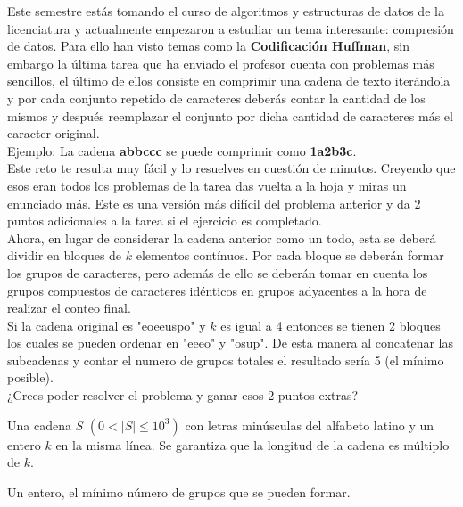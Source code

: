 
Este semestre estás tomando el curso de algoritmos y estructuras de datos de la licenciatura y actualmente empezaron a estudiar un tema interesante: compresión de datos. Para ello han visto temas como la \textbf{Codificación Huffman}, sin embargo la última tarea que ha enviado el profesor cuenta con problemas más sencillos, el último de ellos consiste en comprimir una cadena de texto iterándola y por cada conjunto repetido de caracteres deberás contar la cantidad de los mismos y después reemplazar el conjunto por dicha cantidad de caracteres más el caracter original.
\\

Ejemplo: La cadena  \textbf{abbccc} se puede comprimir como \textbf{1a2b3c}.\\

Este reto te resulta muy fácil y lo resuelves en cuestión de minutos. Creyendo que esos eran todos los problemas de la tarea das vuelta a la hoja y miras un enunciado más. Este es una versión más difícil del problema anterior y da 2 puntos adicionales a la tarea si el ejercicio es completado.\\

Ahora, en lugar de considerar la cadena anterior como un todo, esta se deberá dividir en bloques de $k$ elementos contínuos. Por cada bloque se deberán formar los grupos de caracteres, pero además de ello se deberán tomar en cuenta los grupos compuestos de caracteres idénticos en grupos adyacentes a la hora de realizar el conteo final.\\

Si la cadena original es "eoeeuspo" y $k$ es igual a 4 entonces se tienen 2 bloques los cuales se pueden ordenar en "eeeo" y "osup". De esta manera al concatenar las subcadenas y contar el numero de grupos totales el resultado sería 5 (el mínimo posible).\\

¿Crees poder resolver el problema y ganar esos 2 puntos extras?


Una cadena $S$ $(0 < |S| \leq 10^3)$ con letras minúsculas del alfabeto latino y un entero $k$ en la misma línea. Se garantiza que la longitud de la cadena es múltiplo de $k$.

\outputText

Un entero, el mínimo número de grupos que se pueden formar.

\exampleCases

\begin{example}
\end{example}
